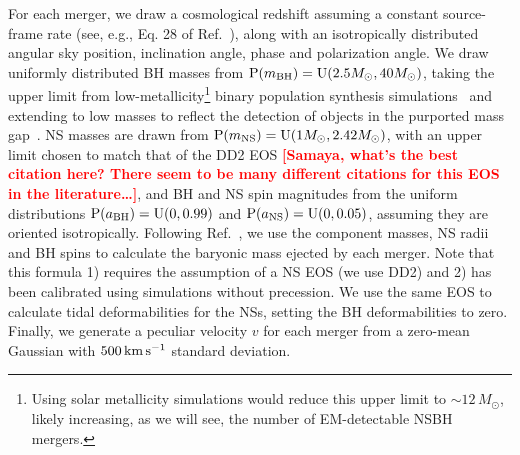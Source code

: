 \documentclass[%
 reprint,
 superscriptaddress,
 nofootinbib,
 amsmath,amssymb,
 aps,
]{revtex4-2}
\newcommand{\msun}{M_\odot}
\newcommand{\prob}{\ensuremath{{\rm P}}}
\newcommand{\abh}{a_{\rm BH}}
\newcommand{\ans}{a_{\rm NS}}
\newcommand{\mbh}{m_{\rm BH}}
\newcommand{\mns}{m_{\rm NS}}
\newcommand{\uniform}{{\rm U}}
\newcommand{\kms}{\ensuremath{{\rm km\,s^{-1}}}}
\newcommand{\smf}[1]{\textcolor{red}{\bf [#1]}}
\begin{document}
For each merger, we draw a cosmological redshift assuming a constant source-frame rate (see, e.g., Eq. 28 of Ref.~\cite{Mortlock_etal:2019}), along with an isotropically distributed angular sky position, inclination angle, phase and polarization angle. We draw uniformly distributed BH masses from $\prob(\mbh) = \uniform(2.5\msun, 40\msun)$, taking the upper limit from low-metallicity\footnote{Using solar metallicity simulations would reduce this upper limit to $\sim12\,\msun$, likely increasing, as we will see, the number of EM-detectable NSBH mergers.}
binary population synthesis simulations~\cite{Kruckow_etal:2018} and extending to low masses to reflect the detection of objects in the purported mass gap~\cite{LVC:2020O3acat}. NS masses are drawn from $\prob(\mns) = \uniform(1\msun, 2.42\msun)$, with an upper limit chosen to match that of the DD2 EOS \smf{Samaya, what's the best citation here? There seem to be many different citations for this EOS in the literature\ldots}, and BH and NS spin magnitudes from the uniform distributions $\prob(\abh) = \uniform(0, 0.99)$ and  $\prob(\ans) = \uniform(0, 0.05)$, assuming they are oriented isotropically. Following Ref.~\cite{Foucart_etal:2018}, we use the component masses, NS radii and BH spins to calculate the baryonic mass ejected by each merger. Note that this formula 1) requires the assumption of a NS EOS (we use DD2) and 2) has been calibrated using simulations without precession. We use the same EOS to calculate tidal deformabilities for the NSs, setting the BH deformabilities to zero. Finally, we generate a peculiar velocity $v$ for each merger from a zero-mean Gaussian with $500\,\kms$ standard deviation.
\end{document}
